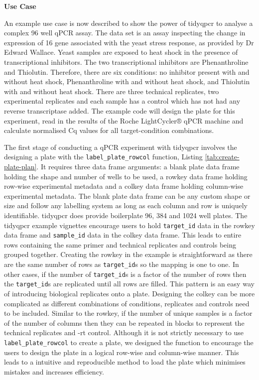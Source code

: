 \documentclass[../main.tex]{subfiles}
\begin{document}
\textbf{Use Case}

An example use case is now described to show the power of tidyqpcr to analyse a complex 96 well qPCR assay.
The data set is an assay inspecting the change in expression of 16 gene associated with the yeast stress response, as provided by Dr Edward Wallace.
Yeast samples are exposed to heat shock in the presence of transcriptional inhibitors.
The two transcriptional inhibitors are Phenanthroline and Thiolutin.
Therefore, there are six conditions: no inhibitor present with and without heat shock, Phenanthroline with and without heat shock, and Thiolutin with and without heat shock.
There are three technical replicates, two experimental replicates and each sample has a control which has not had any reverse transcriptase added.
The example code will design the plate for this experiment, read in the results of the Roche LightCycler® qPCR machine and calculate normalised Cq values for all target-condition combinations.

The first stage of conducting a qPCR experiment with tidyqpcr involves the designing a plate with the \lstinline{label_plate_rowcol} function, Listing  \ref{tab:create-plate-plan}. 
It requires three data frame arguments: a blank plate data frame holding the shape and number of wells to be used, a rowkey data frame holding row-wise experimental metadata and a colkey data frame holding column-wise experimental metadata.
The blank plate data frame can be any custom shape or size and follow any labelling system as long as each column and row is uniquely identifiable. 
tidyqpcr does provide boilerplate 96, 384 and 1024 well plates.
The tidyqpcr example vignettes encourage users to hold \lstinline{target_id} data in the rowkey data frame and \lstinline{sample_id} data in the colkey data frame.
This leads to entire rows containing the same primer and technical replicates and controls being grouped together.
Creating the rowkey in the example is straightforward as there are the same number of rows as \lstinline{target_id}s so the mapping is one to one.
In other cases, if the number of \lstinline{target_id}s is a factor of the number of rows then the \lstinline{target_id}s are replicated until all rows are filled.
This pattern is an easy way of introducing biological replicates onto a plate. 
Designing the colkey can be more complicated as different combinations of conditions, replicates and controls need to be included.
Similar to the rowkey, if the number of unique samples is a factor of the number of columns then they can be repeated in blocks to represent the technical replicates and -rt control.
Although it is not strictly necessary to use \lstinline{label_plate_rowcol} to create a plate, we designed the function to encourage the users to design the plate in a logical row-wise and column-wise manner.
This leads to a intuitive and reproducible method to load the plate which minimises mistakes and increases efficiency. 
\end{document}
